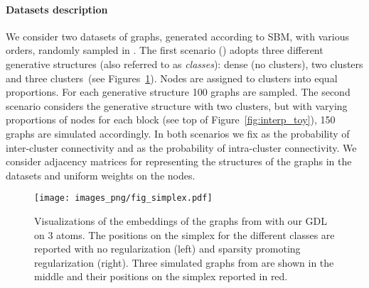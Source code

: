 \documentclass{article}
\begin{document}
	\paragraph{Datasets description}
	We consider two datasets of graphs, generated according to SBM, with various orders, randomly sampled in  .
	The first scenario () adopts three different generative structures (also
	referred to as \emph{classes}): dense (no clusters), two clusters and three
	clusters~(see Figures~\ref{fig:simplex}). Nodes are assigned to
	clusters into equal proportions. For each generative structure 100 graphs are
	sampled.
	The second scenario  considers the generative structure with two clusters,
	but with varying proportions of nodes for each block (see top of
	Figure~\ref{fig:interp_toy}), 150 graphs are simulated
	accordingly.
	In both scenarios we fix  as the probability of inter-cluster connectivity and  as the probability of intra-cluster connectivity. We consider adjacency matrices for representing the structures of the graphs in the datasets and uniform weights on the nodes.
	
	\begin{figure}[t]
		\centering
		\texttt{[image: images\_png/fig\_simplex.pdf]}\vspace{-4mm}
		\caption{Visualizations of the embeddings of the graphs from  with our GDL on 3 atoms. The positions on
			the simplex for the different classes are reported with no regularization
			(left) and sparsity promoting regularization (right). Three simulated graphs from  are shown in the middle and their positions
			on the simplex reported in red.} \label{fig:simplex}
		\vspace{-5mm}
	\end{figure}
	
\end{document}
